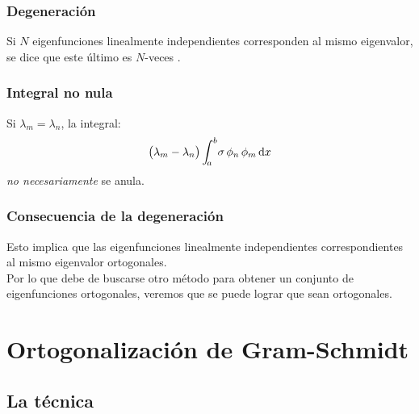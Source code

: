 \documentclass[12pt]{beamer}
\begin{document}
\begin{frame}
\frametitle{Degeneración}
Si $N$ eigenfunciones linealmente independientes corresponden al mismo eigenvalor, se dice que este último es $N$-veces .
\end{frame}
\begin{frame}
\frametitle{Integral no nula}
Si $\lambda_{m} = \lambda_{n}$, la integral:
\pause
\begin{align*}
\big( \lambda_{m} - \lambda_{n} \big) \, \scaleint{5ex}_{\bs a}^{b} \sigma \, \phi_{n} \, \phi_{m} \dd{x}
\end{align*}
\emph{no necesariamente} se anula.
\end{frame}
\begin{frame}
\frametitle{Consecuencia de la degeneración}
Esto implica que las eigenfunciones linealmente independientes correspondientes al mismo eigenvalor  ortogonales.
\\
\bigskip
\pause
Por lo que debe de buscarse otro método para obtener un conjunto de eigenfunciones ortogonales, \pause veremos que  se puede lograr que sean ortogonales.
\end{frame}

\section{Ortogonalización de Gram-Schmidt}
\subsection{La técnica}
\end{document}
